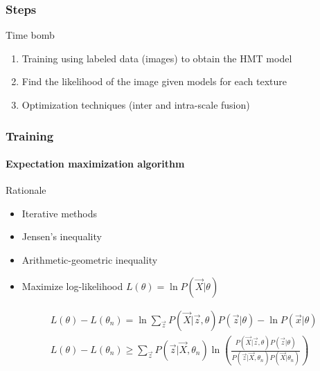 \documentclass[12pt]{beamer}
\begin{document}
\newcommand{\putlink}[1]{%
   \pgfsetlinewidth{1.4pt}%
   \pgfsetendarrow{\pgfarrowtriangle{4pt}}%
   \pgfline{\pgfxy(1,1)}{\pgfxy(#1,1)}
}

\begin{frame}
  \frametitle{Steps}
  
  \begin{block}{Time bomb}
   \begin{enumerate}
    \item Training using labeled data (images) to obtain the HMT model \pause
    \item Find the likelihood of the image given models for each texture \pause
    \item Optimization techniques (inter and intra-scale fusion) \pause
  \end{enumerate}
  \end{block}
\end{frame}

\begin{frame}
  \frametitle{Training}
  \framesubtitle{Expectation maximization algorithm}
  
  \begin{block}{Rationale}
    \begin{itemize}
      \item Iterative methods
	  \item Jensen's inequality
	  \item Arithmetic-geometric inequality
	  \item Maximize log-likelihood $L(\theta) = \ln P(\vec{X} | \theta)$
	\end{itemize}
  \end{block}
  
  \begin{align*}
    & L(\theta) - L(\theta_n) = \ln \sum_\vec{z} P(\vec{X} | \vec{z}, \theta) P(\vec{z} |
    \theta) - \ln P(\vec{x} | \theta) \\
    & L(\theta) - L(\theta_n) \ge \sum_\vec{z} P(\vec{z} | \vec{X}, \theta_n) \ln \left(
    \frac{P(\vec{X} | \vec{z}, \theta) P(\vec{z} | \theta)}{P(\vec{z} | \vec{X}, \theta_n)
    P(\vec{X} | \theta_n)} \right)
  \end{align*}
\end{frame}
\end{document}
